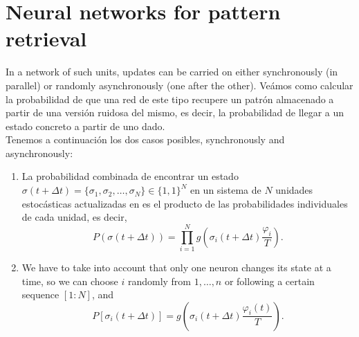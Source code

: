 \chapter{Neural networks for pattern retrieval}
In a network of such units, updates can be carried on either synchronously (in parallel) or randomly asynchronously (one after the other). Veámos como calcular la probabilidad de que una red de este tipo recupere un patrón almacenado a partir de una versión ruidosa del mismo, es decir, la probabilidad de llegar a un estado concreto a partir de uno dado. \\

\noindent
Tenemos a continuación los dos casos posibles, synchronously and asynchronously:
\begin{enumerate}
    \item[Synchronously] La probabilidad combinada de encontrar un estado \mbox{$\sigma(t+\Delta t)=\{\sigma_1, \sigma_2, \ldots, \sigma_N\} \in \{1,1\}^N$} en un sistema de $N$ unidades estocásticas actualizadas en  es el producto de las probabilidades individuales de cada unidad, es decir,
    \begin{equation*}
        P(\sigma(t+\Delta t)) = \prod_{i=1}^N g(\sigma_i(t+\Delta t)\dfrac{\varphi_i}{T}).
    \end{equation*}
    \item[Asynchronously] We have to take into account that only one neuron changes its state at a time, so we can choose $i$ randomly from $1, \ldots, n$ or following a certain sequence $[1 : N ]$, and
    \begin{equation*}
        P[\sigma_i (t + \Delta t)] = g\left(\sigma_i (t + \Delta t)\dfrac{\varphi_i(t)}{T}\right).
    \end{equation*}
\end{enumerate}




